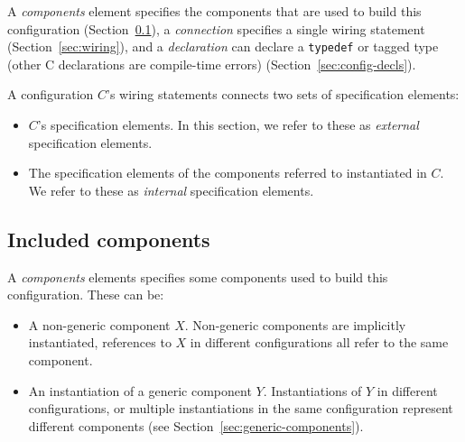 \documentclass[11pt,letterpaper]{article}
\newcommand{\kw}[1]{{\tt #1}}
\begin{document}
A \emph{components} element specifies the components that are used to build
this configuration (Section~\ref{sec:config-components}), a
\emph{connection} specifies a single wiring statement
(Section~\ref{sec:wiring}), and a \emph{declaration} can declare a
\kw{typedef} or tagged type (other C declarations are compile-time errors)
(Section~\ref{sec:config-decls}).

A configuration $C$'s wiring statements connects two sets of specification
elements:
\begin{itemize}
\item $C$'s specification elements. In this section, we refer to these as
\emph{external} specification elements.
\item The specification elements of the components referred to instantiated
in $C$. We refer to these as \emph{internal} specification elements.
\end{itemize}

\subsection{Included components}
\label{sec:config-components}

A \emph{components} elements specifies some components used to build this
configuration. These can be:
\begin{itemize}
\item A non-generic component $X$. Non-generic components are implicitly
instantiated, references to $X$ in different configurations all
refer to the same component.

\item An instantiation of a generic component $Y$. Instantiations of $Y$ in
different configurations, or multiple instantiations in the same
configuration represent different components (see
Section~\ref{sec:generic-components}).
\end{itemize}
\end{document}
